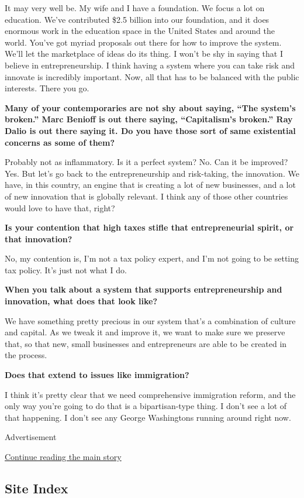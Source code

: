 It may very well be. My wife and I have a foundation. We focus a lot on
education. We've contributed \$2.5 billion into our foundation, and it
does enormous work in the education space in the United States and
around the world. You've got myriad proposals out there for how to
improve the system. We'll let the marketplace of ideas do its thing. I
won't be shy in saying that I believe in entrepreneurship. I think
having a system where you can take risk and innovate is incredibly
important. Now, all that has to be balanced with the public interests.
There you go.

\textbf{Many of your contemporaries are not shy about saying, ``The
system's broken.'' Marc Benioff is out there saying, ``Capitalism's
broken.'' Ray Dalio is out there saying it. Do you have those sort of
same existential concerns as some of them?}

Probably not as inflammatory. Is it a perfect system? No. Can it be
improved? Yes. But let's go back to the entrepreneurship and
risk-taking, the innovation. We have, in this country, an engine that is
creating a lot of new businesses, and a lot of new innovation that is
globally relevant. I think any of those other countries would love to
have that, right?

\textbf{Is your contention that high taxes stifle that entrepreneurial
spirit, or that innovation?}

No, my contention is, I'm not a tax policy expert, and I'm not going to
be setting tax policy. It's just not what I do.

\textbf{When you talk about a system that supports entrepreneurship and
innovation, what does that look like?}

We have something pretty precious in our system that's a combination of
culture and capital. As we tweak it and improve it, we want to make sure
we preserve that, so that new, small businesses and entrepreneurs are
able to be created in the process.

\textbf{Does that extend to issues like immigration?}

I think it's pretty clear that we need comprehensive immigration reform,
and the only way you're going to do that is a bipartisan-type thing. I
don't see a lot of that happening. I don't see any George Washingtons
running around right now.

Advertisement

\protect\hyperlink{after-bottom}{Continue reading the main story}

\hypertarget{site-index}{%
\subsection{Site Index}\label{site-index}}

